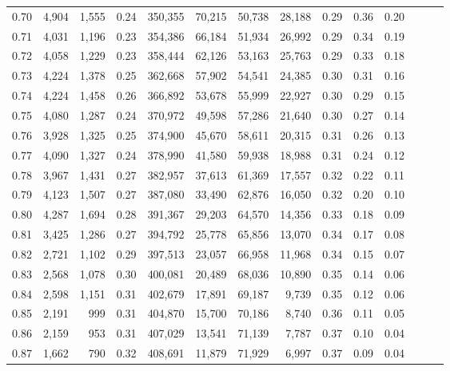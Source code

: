 \begin{tabular}{rrrrrrrrrrrrrr}
0.70 &   4,904 &  1,555 &  0.24 &  350,355 &   70,215 &  50,738 &  28,188 &  0.29 &  0.36 &      0.20 \\
0.71 &   4,031 &  1,196 &  0.23 &  354,386 &   66,184 &  51,934 &  26,992 &  0.29 &  0.34 &      0.19 \\
0.72 &   4,058 &  1,229 &  0.23 &  358,444 &   62,126 &  53,163 &  25,763 &  0.29 &  0.33 &      0.18 \\
0.73 &   4,224 &  1,378 &  0.25 &  362,668 &   57,902 &  54,541 &  24,385 &  0.30 &  0.31 &      0.16 \\
0.74 &   4,224 &  1,458 &  0.26 &  366,892 &   53,678 &  55,999 &  22,927 &  0.30 &  0.29 &      0.15 \\
0.75 &   4,080 &  1,287 &  0.24 &  370,972 &   49,598 &  57,286 &  21,640 &  0.30 &  0.27 &      0.14 \\
0.76 &   3,928 &  1,325 &  0.25 &  374,900 &   45,670 &  58,611 &  20,315 &  0.31 &  0.26 &      0.13 \\
0.77 &   4,090 &  1,327 &  0.24 &  378,990 &   41,580 &  59,938 &  18,988 &  0.31 &  0.24 &      0.12 \\
0.78 &   3,967 &  1,431 &  0.27 &  382,957 &   37,613 &  61,369 &  17,557 &  0.32 &  0.22 &      0.11 \\
0.79 &   4,123 &  1,507 &  0.27 &  387,080 &   33,490 &  62,876 &  16,050 &  0.32 &  0.20 &      0.10 \\
0.80 &   4,287 &  1,694 &  0.28 &  391,367 &   29,203 &  64,570 &  14,356 &  0.33 &  0.18 &      0.09 \\
0.81 &   3,425 &  1,286 &  0.27 &  394,792 &   25,778 &  65,856 &  13,070 &  0.34 &  0.17 &      0.08 \\
0.82 &   2,721 &  1,102 &  0.29 &  397,513 &   23,057 &  66,958 &  11,968 &  0.34 &  0.15 &      0.07 \\
0.83 &   2,568 &  1,078 &  0.30 &  400,081 &   20,489 &  68,036 &  10,890 &  0.35 &  0.14 &      0.06 \\
0.84 &   2,598 &  1,151 &  0.31 &  402,679 &   17,891 &  69,187 &   9,739 &  0.35 &  0.12 &      0.06 \\
0.85 &   2,191 &    999 &  0.31 &  404,870 &   15,700 &  70,186 &   8,740 &  0.36 &  0.11 &      0.05 \\
0.86 &   2,159 &    953 &  0.31 &  407,029 &   13,541 &  71,139 &   7,787 &  0.37 &  0.10 &      0.04 \\
0.87 &   1,662 &    790 &  0.32 &  408,691 &   11,879 &  71,929 &   6,997 &  0.37 &  0.09 &      0.04 \\

\end{tabular}
